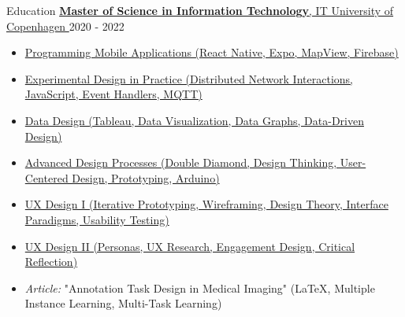 \documentclass{resume}
\begin{document}
\begin{rSection}{Education}
    \href{https://en.itu.dk}{
        \textbf{Master of Science in Information Technology}, IT University of Copenhagen
    }
    \hfill
    2020 - 2022
    \begin{itemize}
        \item \href{https://learnit.itu.dk/local/coursebase/view.php?ciid=666}{Programming Mobile Applications (React Native, Expo, MapView, Firebase)}
        \item \href{https://learnit.itu.dk/local/coursebase/view.php?ciid=589}{Experimental Design in Practice (Distributed Network Interactions, JavaScript, Event Handlers, MQTT)}
        \item \href{https://learnit.itu.dk/local/coursebase/view.php?ciid=578}{Data Design (Tableau, Data Visualization, Data Graphs, Data-Driven Design)}
        \item \href{https://learnit.itu.dk/local/coursebase/view.php?ciid=487}{Advanced Design Processes (Double Diamond, Design Thinking, User-Centered Design, Prototyping, Arduino)}
        \item \href{https://learnit.itu.dk/local/coursebase/view.php?ciid=624}{UX Design I (Iterative Prototyping, Wireframing, Design Theory, Interface Paradigms, Usability Testing)}
        \item \href{https://learnit.itu.dk/local/coursebase/view.php?ciid=681}{UX Design II (Personas, UX Research, Engagement Design, Critical Reflection)}
        \item \textit{Article:} "Annotation Task Design in Medical Imaging" (LaTeX, Multiple Instance Learning, Multi-Task Learning)
    \end{itemize}


\end{rSection}
\end{document}
